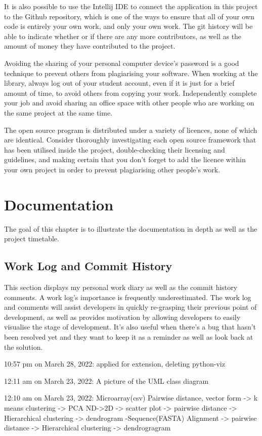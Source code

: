 \documentclass[]{final_report}
\begin{document}
It is also possible to use the Intellij IDE to connect the application in this project to the Github repository, which is one of the ways to ensure that all of your own code is entirely your own work, and only your own work. The git history will be able to indicate whether or if there are any more contributors, as well as the amount of money they have contributed to the project.

Avoiding the sharing of your personal computer device's password is a good technique to prevent others from plagiarising your software. When working at the library, always log out of your student account, even if it is just for a brief amount of time, to avoid others from copying your work. Independently complete your job and avoid sharing an office space with other people who are working on the same project at the same time.

The open source program is distributed under a variety of licences, none of which are identical. Consider thoroughly investigating each open source framework that has been utilised inside the project, double-checking their licensing and guidelines, and making certain that you don't forget to add the licence within your own project in order to prevent plagiarising other people's work.

\chapter{Documentation}
The goal of this chapter is to illustrate the documentation in depth as well as the project timetable.

\section{Work Log and Commit History}
This section displays my personal work diary as well as the commit history comments. A work log's importance is frequently underestimated. The work log and comments will assist developers in quickly re-grasping their previous point of development,  as well as provides motivation by allowing developers to easily visualise the stage of development. It's also useful when there's a bug that hasn't been resolved yet and they want to keep it as a reminder as well as look back at the solution.

10:57 pm on March 28, 2022:
applied for extension, deleting python-viz

12:11 am on March 23, 2022:
A picture of the UML class diagram

12:10 am on March 23, 2022:
Microarray(csv) Pairwise distance, vector form -> k means clustering -> PCA ND->2D -> scatter plot -> pairwise distance -> Hierarchical clustering -> dendrogram -Sequence(FASTA) Alignment -> pairwise distance -> Hierarchical clustering -> dendrogragram
 
\end{document}
